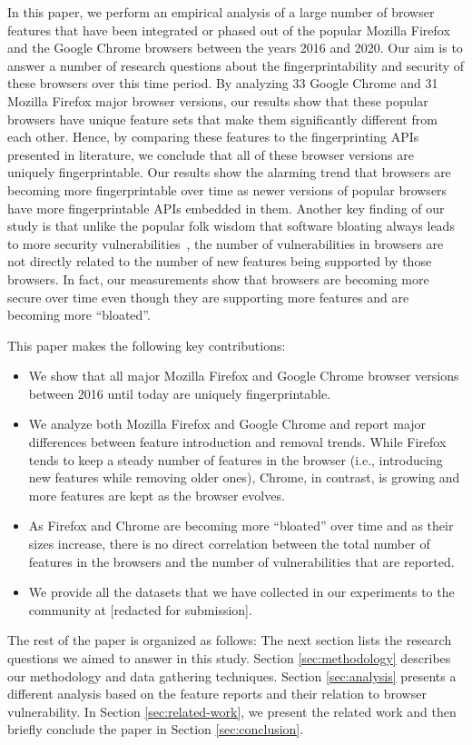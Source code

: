In this paper, we perform an empirical analysis of a large number of
browser features that have been integrated or phased out of the
popular Mozilla Firefox and the Google Chrome browsers between the
years 2016 and 2020. Our aim is to answer a number of research
questions about the fingerprintability and security of these browsers
over this time period. By analyzing 33 Google Chrome and 31 Mozilla
Firefox major browser versions, our results show that these popular
browsers have unique feature sets that make them significantly
different from each other. Hence, by comparing these features to the
fingerprinting APIs presented in literature, we conclude that all of
these browser versions are uniquely fingerprintable. Our results show
the alarming trend that browsers are becoming more fingerprintable
over time as newer versions of popular browsers have more
fingerprintable APIs embedded in them. Another key finding of our
study is that unlike the popular folk wisdom that software bloating
always leads to more security vulnerabilities~\cite{Bloating}, the
number of vulnerabilities in browsers are not directly related to the
number of new features being supported by those browsers. In fact, our
measurements show that browsers are becoming more secure over time
even though they are supporting more features and are becoming more
``bloated''.

This paper makes the following key contributions:

\begin{itemize}

\item We show that all major Mozilla Firefox and Google Chrome browser
  versions between 2016 until today are uniquely fingerprintable.

\item We analyze both Mozilla Firefox and Google Chrome and report
  major differences between feature introduction and removal
  trends. While Firefox tends to keep a steady number of features in
  the browser (i.e., introducing new features while removing older
  ones), Chrome, in contrast, is growing and more features are kept as
  the browser evolves.

\item As Firefox and Chrome are becoming more ``bloated'' over time
  and as their sizes increase, there is no direct correlation between
  the total number of features in the browsers and the number of
  vulnerabilities that are reported.

\item We provide all the datasets that we have collected in our
  experiments to the community at [redacted for submission].
  
\end{itemize}

The rest of the paper is organized as follows: The next section lists
the research questions we aimed to answer in this study. Section
\ref{sec:methodology} describes our methodology and data gathering
techniques. Section \ref{sec:analysis} presents a different analysis
based on the feature reports and their relation to browser
vulnerability. In Section \ref{sec:related-work}, we present the
related work and then briefly conclude the paper in Section
\ref{sec:conclusion}.
